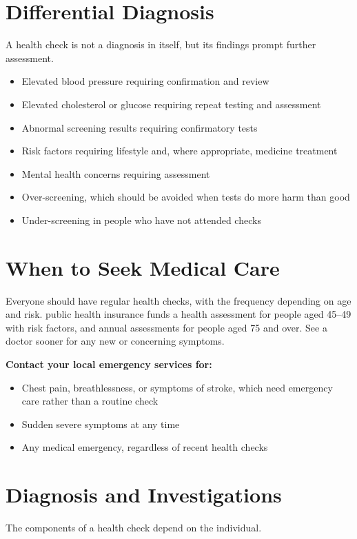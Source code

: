 \section*{Differential Diagnosis}
A health check is not a diagnosis in itself, but its findings prompt further assessment.

\begin{itemize}
    \item Elevated blood pressure requiring confirmation and review
    \item Elevated cholesterol or glucose requiring repeat testing and assessment
    \item Abnormal screening results requiring confirmatory tests
    \item Risk factors requiring lifestyle and, where appropriate, medicine treatment
    \item Mental health concerns requiring assessment
    \item Over-screening, which should be avoided when tests do more harm than good
    \item Under-screening in people who have not attended checks
\end{itemize}

\section*{When to Seek Medical Care}
Everyone should have regular health checks, with the frequency depending on age and risk. public health insurance funds a health assessment for people aged 45--49 with risk factors, and annual assessments for people aged 75 and over. See a doctor sooner for any new or concerning symptoms.

\textbf{Contact your local emergency services for:}
\begin{itemize}
    \item Chest pain, breathlessness, or symptoms of stroke, which need emergency care rather than a routine check
    \item Sudden severe symptoms at any time
    \item Any medical emergency, regardless of recent health checks
\end{itemize}

\section*{Diagnosis and Investigations}
The components of a health check depend on the individual.

